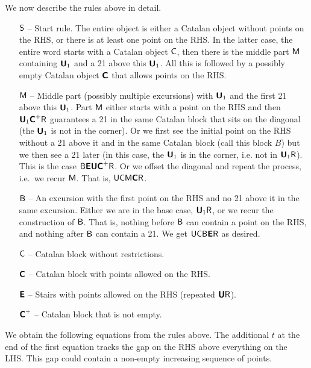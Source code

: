\documentclass[12pt, a4paper, twoside]{report}
\begin{document}
\noindent We now describe the rules above in detail. 

\begin{enumerate}
\item[$\mathsf{S}$ --] Start rule. The entire object is either a Catalan object without points on the RHS, or there is at least one point on the RHS. In the latter case, the entire word starts with a Catalan object $\mathsf{C}$, then there is the middle part $\mathsf{M}$ containing $\textbf{\textsf{U}}_1$ and a 21 above this $\textbf{\textsf{U}}_1$. All this is followed by a possibly empty Catalan object $\textbf{\textsf{C}}$ that allows points on the RHS.
\item[$\mathsf{M}$ --] Middle part (possibly multiple excursions) with $\textbf{\textsf{U}}_1$ and the first 21 above this $\textbf{\textsf{U}}_1$. Part $\mathsf{M}$ either starts with a point on the RHS and then $\textbf{\textsf{U}}_1\textbf{\textsf{C}}^+\mathsf{R}$ guarantees a 21 in the same Catalan block that sits on the diagonal (the $\textbf{\textsf{U}}_1$ is not in the corner). Or we first see the initial point on the RHS without a 21 above it and in the same Catalan block (call this block $B$) but we then see a 21 later (in this case, the $\textbf{\textsf{U}}_1$ is in the corner, i.e. not in $\textbf{\textsf{U}}_1\mathsf{R}$). This is the case $\mathsf{B}\textbf{\textsf{E}}\textbf{\textsf{U}}\textbf{\textsf{C}}^+\mathsf{R}$. Or we offset the diagonal and repeat the process, i.e.~we recur $\mathsf{M}$. That is, $\mathsf{U}\mathsf{C}\mathsf{M}\textbf{\textsf{C}}\mathsf{R}$.
\item[$\mathsf{B}$ --] An excursion with the first point on the RHS and no 21 above it in the same excursion. Either we are in the base case, $\textbf{\textsf{U}}_1\mathsf{R}$, or we recur the construction of $\mathsf{B}$. That is, nothing before $\mathsf{B}$ can contain a point on the RHS, and nothing after $\mathsf{B}$ can contain a 21. We get $\mathsf{U}\mathsf{C}\mathsf{B}\textbf{\textsf{E}}\mathsf{R}$ as desired.
\item[$\mathsf{C}$ --] Catalan block without restrictions.
\item[$\textbf{\textsf{C}}$ --] Catalan block with points allowed on the RHS.
\item[$\textbf{\textsf{E}}$ --] Stairs with points allowed on the RHS (repeated $\textbf{\textsf{U}}\mathsf{R}$).
\item[$\textbf{\textsf{C}}^+$ --] Catalan block that is not empty.
\end{enumerate}

\noindent We obtain the following equations from the rules above. The additional $t$ at the end of the first equation tracks the gap on the RHS above everything on the LHS. This gap could contain a non-empty increasing sequence of points. 
\end{document}
